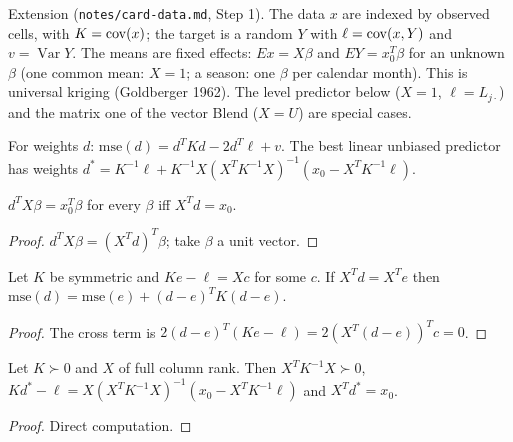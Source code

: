 Extension (\texttt{notes/card-data.md}, Step 1). The data $x$ are indexed by observed
cells, with $K = \operatorname{cov}(x)$; the target is a random $Y$ with $\ell = \operatorname{cov}(x, Y)$ and
$v = \operatorname{Var} Y$. The means are fixed effects: $E x = X\beta$ and $E Y = x_0^T\beta$ for an
unknown $\beta$ (one common mean: $X = 1$; a season: one $\beta$ per calendar month).
This is universal kriging (Goldberger 1962). The level predictor below ($X = 1$,
$\ell = L_{j\cdot}$) and the matrix one of the vector Blend ($X = U$) are special cases.

\begin{definition}\label{def:Blup}
  \leanok
  For weights $d$: $\mathrm{mse}(d) = d^TKd - 2d^T\ell + v$. The best linear unbiased
  predictor has weights
  $d^* = K^{-1}\ell + K^{-1}X(X^TK^{-1}X)^{-1}(x_0 - X^TK^{-1}\ell)$.
\end{definition}

\begin{lemma}\label{lem:Blup_unbiased}
  \leanok
  $d^T X\beta = x_0^T\beta$ for every $\beta$ iff $X^Td = x_0$.
\end{lemma}
\begin{proof}
  \leanok
  $d^TX\beta = (X^Td)^T\beta$; take $\beta$ a unit vector.
\end{proof}

\begin{lemma}\label{lem:Blup_pythagoras}
  \leanok
  Let $K$ be symmetric and $Ke - \ell = Xc$ for some $c$. If $X^Td = X^Te$ then
  $\mathrm{mse}(d) = \mathrm{mse}(e) + (d-e)^TK(d-e)$.
\end{lemma}
\begin{proof}
  \leanok
  The cross term is $2(d-e)^T(Ke - \ell) = 2(X^T(d-e))^Tc = 0$.
\end{proof}

\begin{lemma}\label{lem:Blup_foc}
  \leanok
  Let $K \succ 0$ and $X$ of full column rank. Then $X^TK^{-1}X \succ 0$,
  $Kd^* - \ell = X(X^TK^{-1}X)^{-1}(x_0 - X^TK^{-1}\ell)$ and $X^Td^* = x_0$.
\end{lemma}
\begin{proof}
  \leanok
  Direct computation.
\end{proof}


